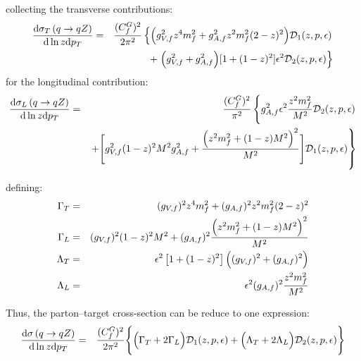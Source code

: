 \documentclass[aps,prd,preprint,superscriptaddress,nofootinbib]{revtex4-2}
\renewcommand{\dd}{\mathrm{d}}
\begin{document}
collecting the transverse contributions:
\begin{eqnarray}
	\frac{\dd\sigma_{T}\left(q\rightarrow qZ\right)}{\dd\ln z\dd p_T} &=& 
	{(C^G_f)^2 \over 2 \pi^2}\left\{
		\Big( g^2_{V,f} z^4m^2_f + g^2_{A,f} z^2m_f^2(2-z)^2\Big)
		\mathcal{D}_1(z,p,\epsilon) 
		\right.
		\nonumber \\  && +
		\left. 
		\Big( g^2_{V,f}+ g^2_{A,f}\Big)
		[1 + (1-z)^2]\epsilon^2
		\mathcal{D}_2(z,p,\epsilon)
	\right\}
\end{eqnarray}
for the longitudinal contribution:
\begin{eqnarray}
\frac{\dd\sigma_{L}\left(q\rightarrow qZ\right)}{ \dd\ln z \dd p_T} &=&
	{(C^G_f)^2 \over \pi^2}
	\left\{
		 g^2_{A,f} \epsilon^2\frac{z^{2}m_{f}^{2}}{M^{2}}\mathcal{D}_{2}(z,p,\epsilon)	
	\right. \\ && \left. +
		\Bigg[ g^2_{V,f} (1-z)^2M^2 g^2_{A,f} + \frac{\left(z^{2}m_{f}^{2}+(1-z)M^{2}\right)^{2}}{M^{2}} \Bigg]\mathcal{D}_1(z,p,\epsilon) 
	\right\}
\end{eqnarray}

defining: 
\begin{eqnarray}
	\Gamma_T & = & (g_{V,f})^2 z^4 m^2_f + (g_{A,f})^2 z^2m^2_f (2-z)^2  \\
	\Gamma_L & = & (g_{V,f})^2(1-z)^2M^2 + (g_{A,f})^2{\Big(z^2m_f^2 + (1-z)M^2\Big)^2 \over M^2 } \\
	\Lambda_T & = & \epsilon^2\left[1+(1-z)^{2}\right]\Big( (g_{V,f})^2 + (g_{A,f})^2\Big)\\
	\Lambda_L & = & \epsilon^2(g_{A,f})^2 {z^2m_f^2 \over M^2}
\end{eqnarray}
\par 
Thus, the parton--target cross-section can be reduce to one expression:
\begin{eqnarray}
	\frac{\dd\sigma\left(q\rightarrow qZ\right)}{\dd\ln z\dd p_T} &=&	
	{ (C^G_f)^2 \over 2 \pi^2}	
	\Bigg\{ \Big( \Gamma_T + 2\Gamma_L \Big)\mathcal{D}_1(z,p,\epsilon)
	+ \Big( \Lambda_T + 2 \Lambda_L \Big)\mathcal{D}_2(z,p,\epsilon)
	\Bigg\} \nonumber \\ 
\end{eqnarray}




\end{document}
